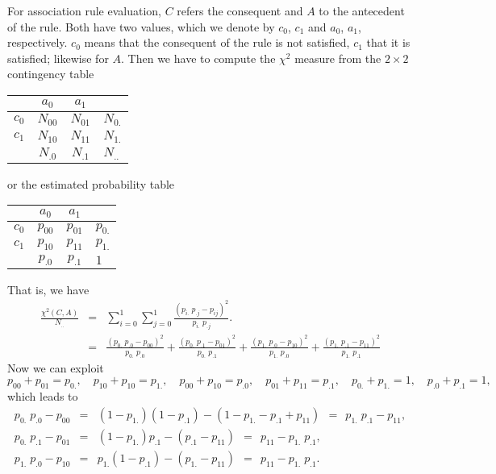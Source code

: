 \documentclass[a4paper]{article}
\def\tabstrut{\rule{0pt}{2.4ex}}
\begin{document}
For association rule evaluation, $C$ refers the consequent and $A$ to
the antecedent of the rule. Both have two values, which we denote by
$c_0$, $c_1$ and $a_0$, $a_1$, respectively. $c_0$ means that the
consequent of the rule is not satisfied, $c_1$ that it is satisfied;
likewise for $A$. Then we have to compute the $\chi^2$ measure from
the $2 \times 2$ contingency table
\begin{center}
\begin{tabular}{|l|c|c|l|} \cline{2-3}
\multicolumn{1}{l|}{}
      & $a_0$    & $a_1$    \\ \hline
$c_0$ & $N_{00}$ & $N_{01}$ & $N_{0.}$\tabstrut \\ \hline
$c_1$ & $N_{10}$ & $N_{11}$ & $N_{1.}$\tabstrut \\ \hline
\multicolumn{1}{l|}{}
      & $N_{.0}$ & $N_{.1}$ & $N_{..}$\tabstrut \\ \cline{2-4}
\end{tabular}
\end{center}
or the estimated probability table
\begin{center}
\begin{tabular}{|l|c|c|l|} \cline{2-3}
\multicolumn{1}{l|}{}
      & $a_0$    & $a_1$    \\ \hline
$c_0$ & $p_{00}$ & $p_{01}$ & $p_{0.}$\tabstrut \\ \hline
$c_1$ & $p_{10}$ & $p_{11}$ & $p_{1.}$\tabstrut \\ \hline
\multicolumn{1}{l|}{}
      & $p_{.0}$ & $p_{.1}$ & $1$\tabstrut \\ \cline{2-4}
\end{tabular}
\end{center}
That is, we have
\begin{eqnarray*}
\frac{\chi^2(C,A)}{N_{..}}
& = & \sum_{i=0}^1 \sum_{j=0}^1
      \frac{(p_{i.}\;p_{.j} - p_{ij})^2}{p_{i.}\;p_{.j}}. \\
& = & \frac{(p_{0.}\;p_{.0} -p_{00})^2}{p_{0.}\;p_{.0}}
  +   \frac{(p_{0.}\;p_{.1} -p_{01})^2}{p_{0.}\;p_{.1}}
  +   \frac{(p_{1.}\;p_{.0} -p_{10})^2}{p_{1.}\;p_{.0}}
  +   \frac{(p_{1.}\;p_{.1} -p_{11})^2}{p_{1.}\;p_{.1}}
\end{eqnarray*}
Now we can exploit
\[ p_{00} + p_{01} = p_{0.}, \quad
   p_{10} + p_{10} = p_{1.}, \quad
   p_{00} + p_{10} = p_{.0}, \quad
   p_{01} + p_{11} = p_{.1}, \quad
   p_{0.} + p_{1.} = 1, \quad
   p_{.0} + p_{.1} = 1, \]
which leads to
\begin{eqnarray*}
p_{0.}\;p_{.0} -p_{00}
& = & (1 -p_{1.})(1 -p_{.1}) -(1 -p_{1.} -p_{.1} +p_{11})
~~=~~ p_{1.}\;p_{.1} -p_{11}, \\
p_{0.}\;p_{.1} -p_{01}
& = & (1 -p_{1.})p_{.1} -(p_{.1} -p_{11})
~~=~~ p_{11} -p_{1.}\;p_{.1}, \\
p_{1.}\;p_{.0} -p_{10}
& = & p_{1.}(1 -p_{.1}) -(p_{1.} -p_{11})
~~=~~ p_{11} -p_{1.}\;p_{.1}. \\
\end{eqnarray*}
\end{document}
